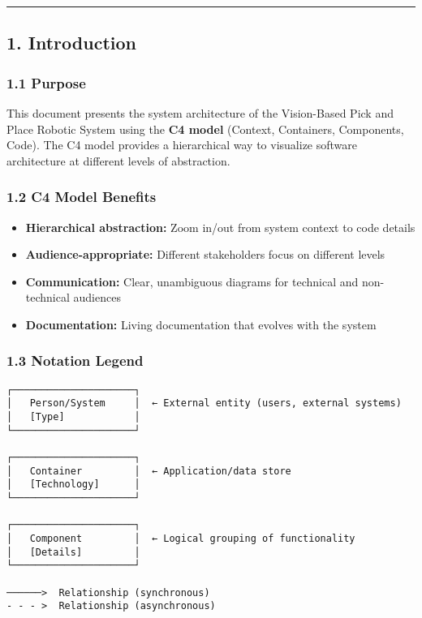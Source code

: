 \documentclass[
]{article}
\providecommand{\tightlist}{%
  \setlength{\itemsep}{0pt}\setlength{\parskip}{0pt}}
\begin{document}
\begin{center}\rule{0.5\linewidth}{0.5pt}\end{center}

\hypertarget{introduction}{%
\subsection{1. Introduction}\label{introduction}}

\hypertarget{purpose}{%
\subsubsection{1.1 Purpose}\label{purpose}}

This document presents the system architecture of the Vision-Based Pick
and Place Robotic System using the \textbf{C4 model} (Context,
Containers, Components, Code). The C4 model provides a hierarchical way
to visualize software architecture at different levels of abstraction.

\hypertarget{c4-model-benefits}{%
\subsubsection{1.2 C4 Model Benefits}\label{c4-model-benefits}}

\begin{itemize}
\tightlist
\item
  \textbf{Hierarchical abstraction:} Zoom in/out from system context to
  code details
\item
  \textbf{Audience-appropriate:} Different stakeholders focus on
  different levels
\item
  \textbf{Communication:} Clear, unambiguous diagrams for technical and
  non-technical audiences
\item
  \textbf{Documentation:} Living documentation that evolves with the
  system
\end{itemize}

\hypertarget{notation-legend}{%
\subsubsection{1.3 Notation Legend}\label{notation-legend}}

\begin{verbatim}
┌─────────────────────┐
│   Person/System     │  ← External entity (users, external systems)
│   [Type]            │
└─────────────────────┘

┌─────────────────────┐
│   Container         │  ← Application/data store
│   [Technology]      │
└─────────────────────┘

┌─────────────────────┐
│   Component         │  ← Logical grouping of functionality
│   [Details]         │
└─────────────────────┘

──────>  Relationship (synchronous)
- - - >  Relationship (asynchronous)
\end{verbatim}
\end{document}
